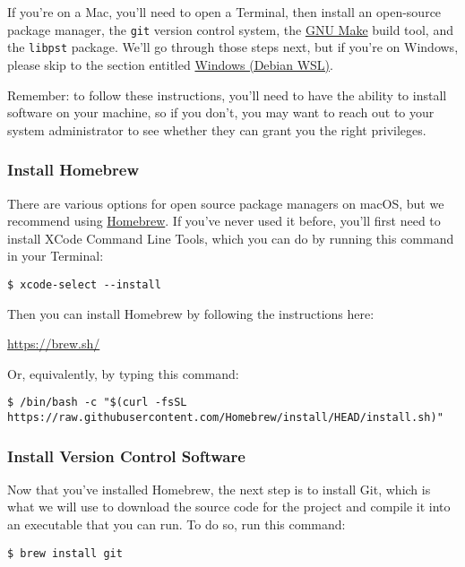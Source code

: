 \documentclass[11pt]{article}
\begin{document}
If you're on a Mac, you'll need to open a Terminal, then install an
open-source package manager, the \texttt{git} version control system, the \href{https://www.gnu.org/software/make/}{GNU
Make} build tool, and the \texttt{libpst} package.  We'll go through those
steps next, but if you're on Windows, please skip to the section
entitled \hyperref[orgad22b61]{Windows (Debian WSL)}.

Remember: to follow these instructions, you'll need to have the
ability to install software on your machine, so if you don't, you may
want to reach out to your system administrator to see whether they can
grant you the right privileges.

\subsubsection*{Install Homebrew}
\label{sec:org0a674a3}

There are various options for open source package managers on macOS,
but we recommend using \href{https://brew.sh}{Homebrew}.  If you've never used it
before, you'll first need to install XCode Command Line Tools, which
you can do by running this command in your Terminal:

\begin{verbatim}
$ xcode-select --install
\end{verbatim}

Then you can install Homebrew by following the instructions here:

\url{https://brew.sh/}

Or, equivalently, by typing this command:

\footnotesize

\begin{verbatim}
$ /bin/bash -c "$(curl -fsSL https://raw.githubusercontent.com/Homebrew/install/HEAD/install.sh)"
\end{verbatim}

\normalsize

\subsubsection*{Install Version Control Software}
\label{sec:org521c1d5}

Now that you've installed Homebrew, the next step is to install Git,
which is what we will use to download the source code for the project
and compile it into an executable that you can run.  To do so, run
this command:

\begin{verbatim}
$ brew install git
\end{verbatim}
\end{document}
